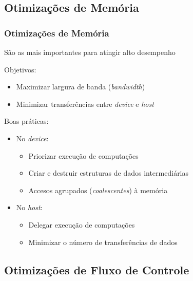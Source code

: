 \documentclass[10pt, compress]{beamer}
\begin{document}
\subsection{Otimizações de Memória}

\begin{frame}
    \frametitle{Otimizações de Memória}
    São as \alert{mais importantes} para atingir \alert{alto desempenho}
    \pause

    Objetivos:
    \begin{itemize}
        \item Maximizar \alert{largura de banda} (\textit{bandwidth})
            \pause
        \item Minimizar \alert{transferências} entre \textit{device} e \textit{host}
            \pause
    \end{itemize}

    Boas práticas:
    \pause

    \begin{itemize}
        \item No \textit{device}:
            \pause
            \begin{itemize}
                \item Priorizar execução de \alert{computações}
                    \pause
                \item Criar e destruir \alert{estruturas de dados intermediárias}
                    \pause
                \item Accesos \alert{agrupados} (\textit{coalescentes}) à memória
            \end{itemize}
            \pause
        \item No \textit{host}:
            \pause
            \begin{itemize}
                \item Delegar execução de \alert{computações}
                    \pause
                \item Minimizar o número de \alert{transferências de dados}
            \end{itemize}
    \end{itemize}
\end{frame}

\subsection{Otimizações de Fluxo de Controle}
\end{document}

